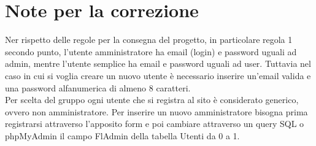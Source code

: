 
\section*{Note per la correzione}
Ner rispetto delle regole per la consegna del progetto, in particolare regola 1 secondo punto, l'utente amministratore ha email (login) e password uguali ad admin, mentre l’utente semplice ha email e password uguali ad user. Tuttavia nel caso in cui si voglia creare un nuovo utente è necessario inserire un'email valida e una password alfanumerica di almeno 8 caratteri. \\
Per scelta del gruppo ogni utente che si registra al sito è considerato generico, ovvero non amministratore. Per inserire un nuovo amministratore bisogna prima registrarsi attraverso l'apposito form e poi cambiare attraverso un query SQL o phpMyAdmin il campo FlAdmin della tabella Utenti da 0 a 1.
